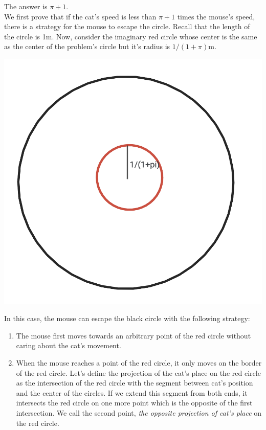 \begin{solution}
The answer is $\pi + 1$.\\[0.2cm]

We first prove that if the cat's speed is less than $\pi + 1$ times the mouse's speed, there is a strategy for the mouse to escape the circle. Recall that the length of the circle is 1m. Now, consider the imaginary red circle whose center is the same as the center of the problem's circle but it's radius is $1/(1+\pi)$m.
\begin{center}
	\includegraphics{68/figs/68_sol1.png}
\end{center}
In this case, the mouse can escape the black circle with the following strategy:
\begin{enumerate}
	\item The mouse first moves towards an arbitrary point of the red circle without caring about the cat's movement.
	\item When the mouse reaches a point of the red circle, it only moves on the border of the red circle. Let's define the projection of the cat's place on the red circle as the intersection of the red circle with the segment between cat's position and the center of the circles. If we extend this segment from both ends, it intersects the red circle on one more point which is the opposite of the first intersection. We call the second point, \textit{the opposite projection of cat's place} on the red circle.\\

\end{enumerate}
\end{solution}
